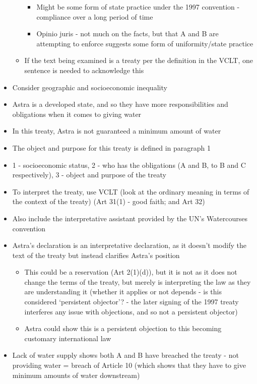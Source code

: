 \begin{itemize}
\begin{itemize}
\begin{itemize}
            \item Might be some form of state practice under the 1997 convention - compliance over a long period of time
            \item Opinio juris - not much on the facts, but that A and B are attempting to enforce suggests some form of uniformity/state practice            
        \end{itemize}
        \item If the text being examined is a treaty per the definition in the VCLT, one sentence is needed to acknowledge this
    \end{itemize}
    \item Consider geographic and socioeconomic inequality
    \item Astra is a developed state, and so they have more responsibilities and obligations when it comes to giving water
    \item In this treaty, Astra is not guaranteed a minimum amount of water
    \item The object and purpose for this treaty is defined in paragraph 1
    \item 1 - socioeconomic status, 2 - who has the obligations (A and B, to B and C respectively), 3 - object and purpose of the treaty
    \item To interpret the treaty, use VCLT (look at the ordinary meaning in terms of the context of the treaty) (Art 31(1) - good faith; and Art 32)
    \item Also include the interpretative assistant provided by the UN's Watercourses convention
    \item Astra's declaration is an interpretative declaration, as it doesn't modify the text of the treaty but instead clarifies Astra's position
    \begin{itemize}
        \item This could be a reservation (Art 2(1)(d)), but it is not as it does not change the terms of the treaty, but merely is interpreting the law as they are understanding it (whether it applies or not depends - is this considered `persistent objector'? - the later signing of the 1997 treaty interferes any issue with objections, and so not a persistent objector)
        \item Astra could show this is a persistent objection to this becoming customary international law        
    \end{itemize}
    \item Lack of water supply shows both A and B have breached the treaty - not providing water = breach of Article 10 (which shows that they have to give minimum amounts of water downstream)

\end{itemize}

